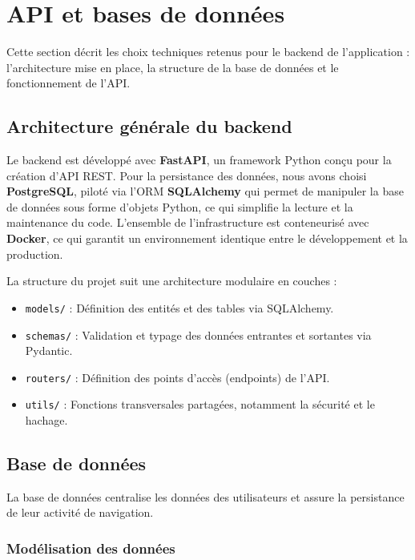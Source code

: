\section{API et bases de données}
\label{sec:backend}

Cette section décrit les choix techniques retenus pour le backend de l'application : l'architecture mise en place, la structure de la base de données et le fonctionnement de l'API.

\subsection{Architecture générale du backend}

Le backend est développé avec \textbf{FastAPI}, un framework Python conçu pour la création d'API REST. Pour la persistance des données, nous avons choisi \textbf{PostgreSQL}, piloté via l'ORM \textbf{SQLAlchemy} qui permet de manipuler la base de données sous forme d'objets Python, ce qui simplifie la lecture et la maintenance du code. L'ensemble de l'infrastructure est conteneurisé avec \textbf{Docker}, ce qui garantit un environnement identique entre le développement et la production.

La structure du projet suit une architecture modulaire en couches :
\begin{itemize}
    \item \texttt{models/} : Définition des entités et des tables via SQLAlchemy.
    \item \texttt{schemas/} : Validation et typage des données entrantes et sortantes via Pydantic.
    \item \texttt{routers/} : Définition des points d'accès (endpoints) de l'API.
    \item \texttt{utils/} : Fonctions transversales partagées, notamment la sécurité et le hachage.
\end{itemize}

\subsection{Base de données}

La base de données centralise les données des utilisateurs et assure la persistance de leur activité de navigation.

\subsubsection{Modélisation des données}

